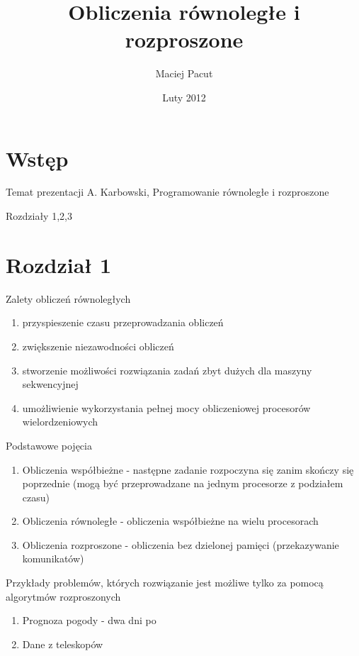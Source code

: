 \documentclass{beamer}
\title{Obliczenia równoległe i rozproszone}
\author{Maciej Pacut}
\date{Luty 2012}
\begin{document}
\begin{frame}
  \titlepage
\end{frame}

\begin{frame}
\tableofcontents[allowframebreaks]
\end{frame}

\section{Wstęp}
\begin{frame}{Temat prezentacji}
  A. Karbowski, Programowanie równoległe i rozproszone

  Rozdziały 1,2,3
\end{frame}
\section{Rozdział 1}

\begin{frame}{Zalety obliczeń równoległych}
  \begin{enumerate}[<+->]
    \item przyspieszenie czasu przeprowadzania obliczeń
    \item zwiększenie niezawodności obliczeń
    \item stworzenie możliwości rozwiązania zadań zbyt dużych dla maszyny sekwencyjnej
    \item umożliwienie wykorzystania pełnej mocy obliczeniowej procesorów wielordzeniowych
  \end{enumerate}
\end{frame}

\begin{frame}{Podstawowe pojęcia}
  \begin{enumerate}
    \item Obliczenia współbieżne - następne zadanie rozpoczyna się zanim skończy się poprzednie (mogą być przeprowadzane na jednym procesorze z podziałem czasu)
    \item Obliczenia równoległe - obliczenia współbieżne na wielu procesorach
    \item Obliczenia rozproszone - obliczenia bez dzielonej pamięci (przekazywanie komunikatów)
  \end{enumerate}
\end{frame}

\begin{frame}{Przykłady problemów, których rozwiązanie jest możliwe tylko za pomocą algorytmów rozproszonych}
  \begin{enumerate}
    \item Prognoza pogody - dwa dni po
    \item Dane z teleskopów
  \end{enumerate}
\end{frame}
\end{document}
